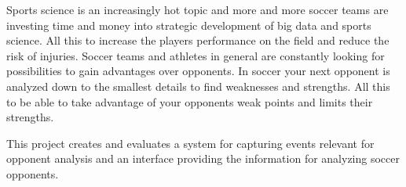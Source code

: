 Sports science is an increasingly hot topic and more and more soccer teams are investing time and money into strategic development of big data and sports science. All this to increase the players performance on the field and reduce the risk of injuries. Soccer teams and athletes in general are constantly looking for possibilities to gain advantages over opponents. In soccer your next opponent is analyzed down to the smallest details to find weaknesses and strengths. All this to be able to take advantage of your opponents weak points and limits their strengths.

This project creates and evaluates a system for capturing events relevant for opponent analysis and an interface providing the information for analyzing soccer opponents.

